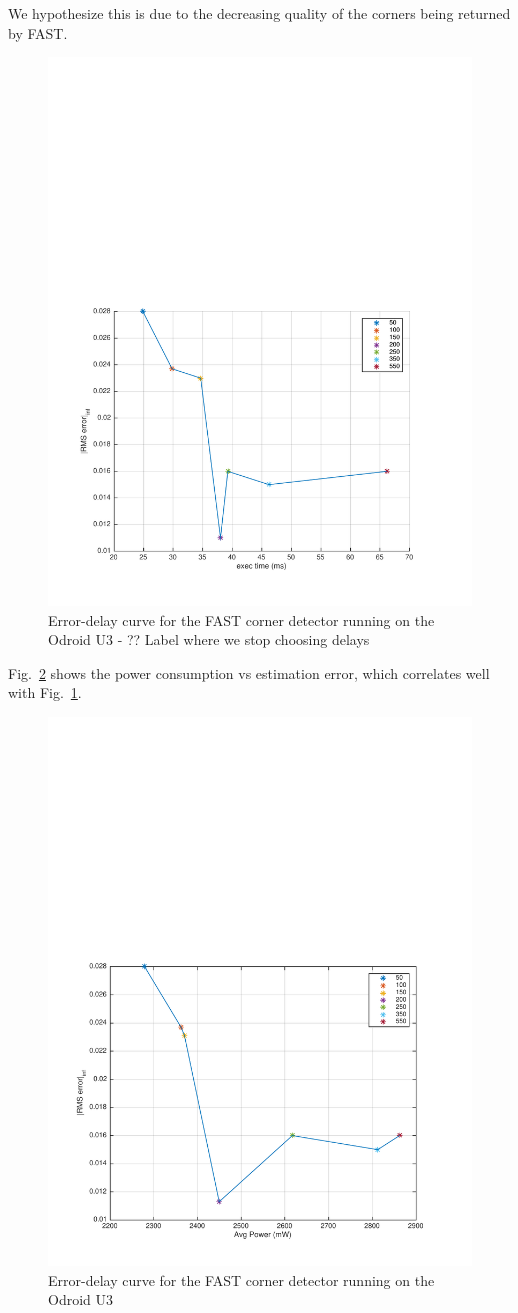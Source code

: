 We hypothesize this is due to the decreasing quality of the corners being returned by FAST.
\begin{figure}[t]
\centering
\includegraphics[width=0.7\linewidth]{figures/init_eps_delta_90th}
\caption{Error-delay curve for the FAST corner detector running on the Odroid U3 - ?? Label where we stop choosing delays}
\label{fig:fast}
\end{figure}

Fig.~\ref{fig:fastErrVsPower} shows the power consumption vs estimation error, which correlates well with Fig.~\ref{fig:fast}.
\begin{figure}[t]
	\centering
	\includegraphics[width=0.7\linewidth]{figures/errVsPower}
	\caption{Error-delay curve for the FAST corner detector running on the Odroid U3}
	\label{fig:fastErrVsPower}
\end{figure}
